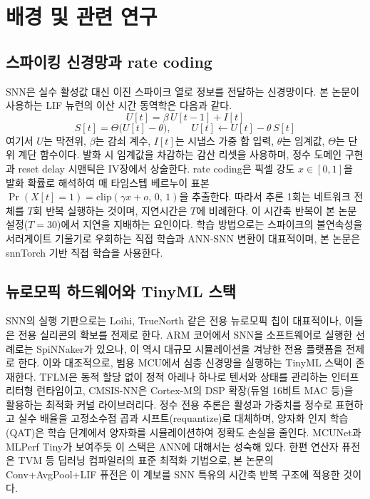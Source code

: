 \section{배경 및 관련 연구}\label{sec:background}

\subsection{스파이킹 신경망과 rate coding}

SNN은 실수 활성값 대신 이진 스파이크 열로 정보를 전달하는 신경망이다\cite{maass1997networks}. 본 논문이 사용하는 LIF 뉴런의 이산 시간 동역학은 다음과 같다.
\begin{equation}
U[t] = \beta\, U[t-1] + I[t]
\label{eq:lif-bg}
\end{equation}
\begin{equation}
S[t] = \Theta\bigl(U[t]-\theta\bigr),\qquad U[t] \leftarrow U[t] - \theta\, S[t]
\label{eq:lif-reset}
\end{equation}
여기서 $U$는 막전위, $\beta$는 감쇠 계수, $I[t]$는 시냅스 가중 합 입력, $\theta$는 임계값, $\Theta$는 단위 계단 함수이다. 발화 시 임계값을 차감하는 감산 리셋을 사용하며, 정수 도메인 구현과 reset delay 시맨틱은 IV장에서 상술한다. rate coding은 픽셀 강도 $x\in[0,1]$을 발화 확률로 해석하여 매 타임스텝 베르누이 표본 $\Pr(X[t]{=}1)=\mathrm{clip}(\gamma x+o,\,0,\,1)$을 추출한다. 따라서 추론 1회는 네트워크 전체를 $T$회 반복 실행하는 것이며, 지연시간은 $T$에 비례한다. 이 시간축 반복이 본 논문 설정($T{=}30$)에서 지연을 지배하는 요인이다. 학습 방법으로는 스파이크의 불연속성을 서러게이트 기울기로 우회하는 직접 학습\cite{neftci2019surrogate,wu2018stbp}과 ANN-SNN 변환\cite{rueckauer2017conversion}이 대표적이며, 본 논문은 snnTorch\cite{eshraghian2023training} 기반 직접 학습을 사용한다.

\subsection{뉴로모픽 하드웨어와 TinyML 스택}

SNN의 실행 기판으로는 Loihi\cite{davies2018loihi}, TrueNorth\cite{merolla2014truenorth} 같은 전용 뉴로모픽 칩이 대표적이나\cite{roy2019towards}, 이들은 전용 실리콘의 확보를 전제로 한다. ARM 코어에서 SNN을 소프트웨어로 실행한 선례로는 SpiNNaker\cite{furber2014spinnaker}가 있으나, 이 역시 대규모 시뮬레이션을 겨냥한 전용 플랫폼을 전제로 한다. 이와 대조적으로, 범용 MCU에서 심층 신경망을 실행하는 TinyML 스택이 존재한다. TFLM은 동적 할당 없이 정적 아레나 하나로 텐서와 상태를 관리하는 인터프리터형 런타임이고\cite{david2021tflm}, CMSIS-NN은 Cortex-M의 DSP 확장(듀얼 16비트 MAC 등)을 활용하는 최적화 커널 라이브러리다\cite{lai2018cmsisnn}. 정수 전용 추론은 활성과 가중치를 정수로 표현하고 실수 배율을 고정소수점 곱과 시프트(requantize)로 대체하며\cite{jacob2018quantization}, 양자화 인지 학습(QAT)은 학습 단계에서 양자화를 시뮬레이션하여 정확도 손실을 줄인다. MCUNet\cite{lin2020mcunet}과 MLPerf Tiny\cite{banbury2021mlperftiny}가 보여주듯 이 스택은 ANN에 대해서는 성숙해 있다. 한편 연산자 퓨전은 TVM\cite{chen2018tvm} 등 딥러닝 컴파일러의 표준 최적화 기법으로, 본 논문의 Conv+AvgPool+LIF 퓨전은 이 계보를 SNN 특유의 시간축 반복 구조에 적용한 것이다.

